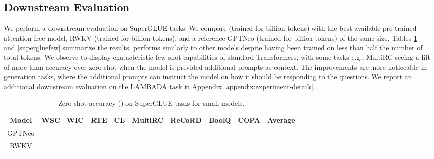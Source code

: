\subsection{Downstream Evaluation}
We perform a downstream evaluation on SuperGLUE \citep{wang2019superglue} tasks. We compare  (trained for  billion tokens) with the best available pre-trained attention-free model, RWKV \citep{PENG_RWKV-LM_2021} (trained for  billion tokens), and a reference GPTNeo \citep{gpt-neo} (trained for  billion tokens) of the same size. Tables \ref{supergluezero} and \ref{supergluefew} summarize the results.  performs similarly to other models despite having been trained on less than half the number of total tokens. We observe  to display characteristic few-shot capabilities of standard Transformers, with some tasks e.g., MultiRC seeing a lift of more than  accuracy over zero-shot when the model is provided additional prompts as context. The improvements are more noticeable in generation tasks, where the additional prompts can instruct the model on how it should be responding to the questions. We report an additional downstream evaluation on the LAMBADA  task \citep{paperno2016lambada} in Appendix \ref{appendix:experiment-details}.
\begin{table}[!h]
\small
\centering
\caption{Zero-shot accuracy () on {\sc SuperGLUE} tasks for small models.}
\label{supergluezero}
\vspace{2mm}
\setlength{\tabcolsep}{4pt}
\begin{tabular}{@{}c|ccccccccc@{}}
\toprule
Model &\multicolumn{1}{c}{{\sc WSC}} & \multicolumn{1}{c}{{\sc WIC}} & \multicolumn{1}{c}{{\sc RTE}} & \multicolumn{1}{c}{{\sc CB}} & \multicolumn{1}{c}{{\sc MultiRC}} &  \multicolumn{1}{c}{{\sc ReCoRD}} &  \multicolumn{1}{c}{{\sc BoolQ}} &  \multicolumn{1}{c}{{\sc COPA}} & \multicolumn{1}{c}{{\sc Average}} \\
\midrule 
GPTNeo \citep{gpt-neo} &  &  &  &  &  &  &  &  &  \\ 
RWKV \citep{PENG_RWKV-LM_2021} &  &  &  &  &  &  &  &  &  \\
 &  &  &  &  &  &  &  &  &  \\
\bottomrule
\end{tabular}
\end{table}
